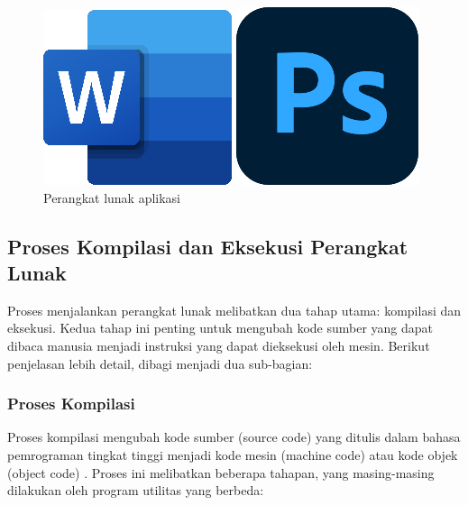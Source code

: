 \begin{figure}[!htb]
	\begin{minipage}{0.5\textwidth}
		\centering
		\includegraphics[width=0.3\linewidth]
		{assets/pics/word.png}
	\end{minipage}
	\begin{minipage}{0.5\textwidth}
		\includegraphics[width=0.3\linewidth]
		{assets/pics/photoshop.png}
	\end{minipage}
	\caption{Perangkat lunak aplikasi}
\end{figure}

\subsection{Proses Kompilasi dan Eksekusi Perangkat Lunak}
Proses menjalankan perangkat lunak melibatkan dua tahap utama: kompilasi dan eksekusi. Kedua tahap ini penting untuk mengubah kode sumber yang dapat dibaca manusia menjadi instruksi yang dapat dieksekusi oleh mesin. Berikut penjelasan lebih detail, dibagi menjadi dua sub-bagian:

\subsubsection{Proses Kompilasi}
Proses kompilasi mengubah kode sumber (source code) yang ditulis dalam bahasa pemrograman tingkat tinggi menjadi kode mesin (machine code) atau kode objek (object code) \cite{tut24}. Proses ini melibatkan beberapa tahapan, yang masing-masing dilakukan oleh program utilitas yang berbeda:


